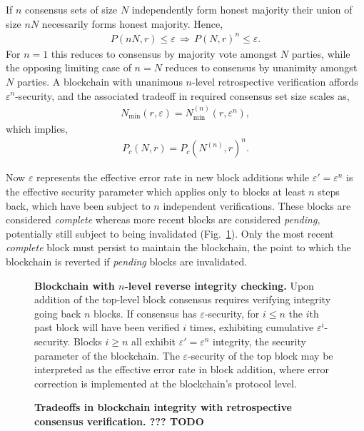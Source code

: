 If $n$ consensus sets of size $N$ independently form honest majority their union of size $nN$ necessarily forms honest majority. Hence,
\begin{align}
	P(nN,r)\leq\varepsilon \,\Rightarrow\, P(N,r)^n\leq\varepsilon.
\end{align}
For $n=1$ this reduces to consensus by majority vote amongst $N$ parties, while the opposing limiting case of $n=N$ reduces to consensus by unanimity amongst $N$ parties. A blockchain with unanimous $n$-level retrospective verification affords $\varepsilon^n$-security, and the associated tradeoff in required consensus set size scales as,
\begin{align}
	N_\mathrm{min}(r,\varepsilon) = N_\mathrm{min}^{(n)}(r,\varepsilon^n),
\end{align}
which implies,
\begin{align}
	P_c(N,r) = P_c(N^{(n)},r)^n.
\end{align}

Now $\varepsilon$ represents the effective error rate in new block additions while \mbox{$\varepsilon'=\varepsilon^n$} is the effective security parameter which applies only to blocks at least $n$ steps back, which have been subject to $n$ independent verifications. These blocks are considered \emph{complete} whereas more recent blocks are considered \emph{pending}, potentially still subject to being invalidated (Fig.~\ref{fig:backward_integrity}). Only the most recent \emph{complete} block must persist to maintain the blockchain, the point to which the blockchain is reverted if \emph{pending} blocks are invalidated.

\begin{figure}[!htb]
	
	\caption{\textbf{Blockchain with $n$-level reverse integrity checking.} Upon addition of the top-level block consensus requires verifying integrity going back $n$ blocks. If consensus has $\varepsilon$-security, for $i\leq n$ the $i$th past block will have been verified $i$ times, exhibiting cumulative $\varepsilon^i$-security. Blocks $i\geq n$ all exhibit $\varepsilon'=\varepsilon^n$ integrity, the security parameter of the blockchain. The $\varepsilon$-security of the top block may be interpreted as the effective error rate in block addition, where error correction is implemented at the blockchain's protocol level.} \label{fig:backward_integrity}
\end{figure}

\begin{figure}[!htb]
	\centering
	
	\caption{\textbf{Tradeoffs in blockchain integrity with retrospective consensus verification. ??? TODO}}\label{fig:blockchain_security_tradeoff}
\end{figure}